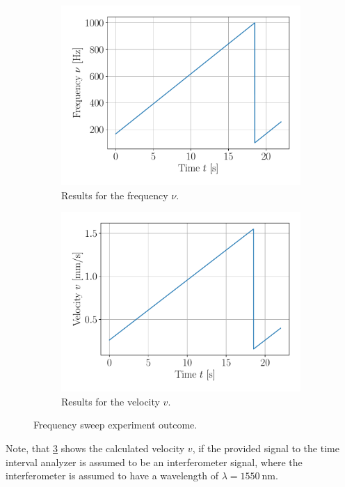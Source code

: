 \documentclass{report}
\numberwithin{tm}{section}
\begin{document}
\begin{figure}[h]
	\centering
	\begin{subfigure}[t]{0.49\textwidth}
	\centering
	\includegraphics[width=\textwidth]{figures/freq_lin_sweep.pdf}
	\caption{Results for the frequency $\nu$.}
	\label{fig:freq_lin_sweep}
	\end{subfigure}
	\hfill
	\begin{subfigure}[t]{0.49\textwidth}
	\centering
	\includegraphics[width=\textwidth]{figures/vel_lin_sweep.pdf}
	\caption{Results for the velocity $v$.}
	\label{fig:vel_lin_sweep}
	\end{subfigure}
	\caption{Frequency sweep experiment outcome.}
	\label{fig:freq_sweep_outcomes}
\end{figure}
Note, that \cref{fig:freq_sweep_outcomes} shows the calculated velocity $v$, if the provided signal to the time interval analyzer is assumed to be an interferometer signal, where the interferometer is assumed to have a wavelength of $\lambda = \SI{1550}{\nano\meter}$.
\end{document}
